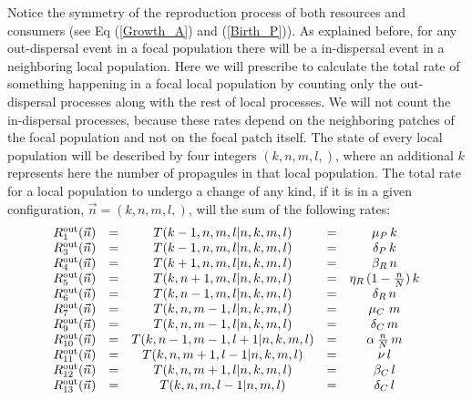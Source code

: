 Notice the symmetry of the reproduction process of both resources and consumers (see Eq (\ref{Growth_A}) and (\ref{Birth_P})). As explained before, for any out-dispersal event in a focal population there will be a in-dispersal event in a neighboring local population. Here we will prescribe to calculate the total rate of something happening in a focal local population by counting only the out-dispersal processes along with the rest of local processes. We will not count the in-dispersal processes, because these rates depend on the neighboring patches of the focal population and not on the focal patch itself. The state of every local population will be described by four integers $(k,n,m,l,)$, where an additional $k$ represents here the number of propagules in that local population. The total rate for a local population to undergo a change of any kind, if it is in a given configuration, $\vec{n}=(k,n,m,l,)$, will the sum of the following rates:
\begin{equation}
\begin{array}{ccccc}
R^{\textup{out}}_1(\vec{n})    &=& T(k-1,n,m,l | n,k,m,l)     &=& \mu_P\,k                   \\
R^{\textup{out}}_3(\vec{n})    &=& T(k-1,n,m,l | n,k,m,l)     &=& \delta_P\,k                \\	
R^{\textup{out}}_4(\vec{n})    &=& T(k+1,n,m,l | n,k,m,l)     &=& \beta_R\,n                 \\
R^{\textup{out}}_5(\vec{n})    &=& T(k,n+1,m,l | n,k,m,l)     &=& \eta_R\,(1-\frac{n}{N})\,k \\
R^{\textup{out}}_6(\vec{n})    &=& T(k,n-1,m,l | n,k,m,l)     &=& \delta_R\,n                \\
R^{\textup{out}}_7(\vec{n})    &=& T(k,n,m-1,l | n,k,m,l)     &=& \mu_C\,\,m                 \\
R^{\textup{out}}_9(\vec{n})    &=& T(k,n,m-1,l | n,k,m,l)     &=& \delta_C \,m               \\
R^{\textup{out}}_{10}(\vec{n}) &=& T(k,n-1,m-1,l+1 | n,k,m,l) &=& \alpha\,\frac{n}{N}\,m     \\
R^{\textup{out}}_{11}(\vec{n}) &=& T(k,n,m+1,l-1 | n,k,m,l)   &=& \nu \,l                    \\
R^{\textup{out}}_{12}(\vec{n}) &=& T(k,n,m+1,l | n,k,m,l)     &=& \beta_C \,l                \\
R^{\textup{out}}_{13}(\vec{n}) &=& T(k,n,m,l-1 | n,m,l)       &=& \delta_C \,l
\end{array}	
\end{equation}  
